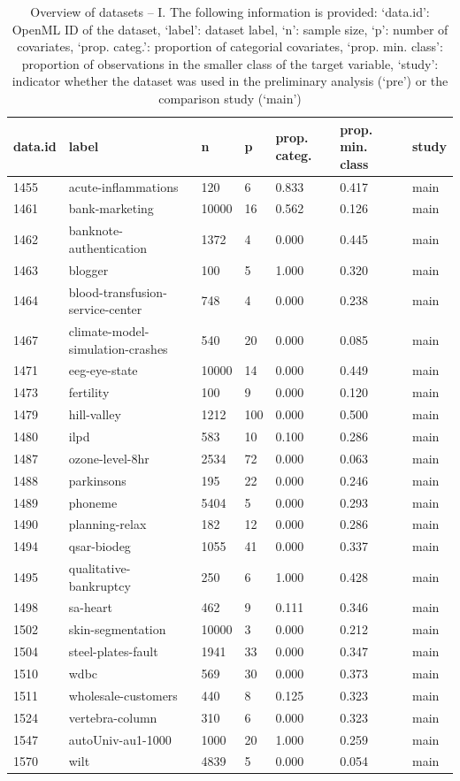 \begin{table}[!htb]
\caption{Overview of datasets -- I. The following information is provided: `data.id': OpenML ID of the dataset, `label': dataset label, `n': sample size, `p': number of covariates, `prop. categ.': proportion of categorial covariates, `prop. min. class': proportion of observations in the smaller class of the target variable, `study': indicator whether the dataset was used in the preliminary analysis (`pre') or the comparison study (`main')}
\label{tab:data1}
\begin{tabular}{l | l | l | l | l | l | l}
data.id & label & n & p & prop. categ. & prop. min. class & study \\
\hline
1455 & acute-inflammations & 120 & 6 & 0.833 & 0.417 & main \\
1461 & bank-marketing & 10000 & 16 & 0.562 & 0.126 & main \\
1462 & banknote-authentication & 1372 & 4 & 0.000 & 0.445 & main \\
1463 & blogger & 100 & 5 & 1.000 & 0.320 & main \\
1464 & blood-transfusion-service-center & 748 & 4 & 0.000 & 0.238 & main \\
1467 & climate-model-simulation-crashes & 540 & 20 & 0.000 & 0.085 & main \\
1471 & eeg-eye-state & 10000 & 14 & 0.000 & 0.449 & main \\
1473 & fertility & 100 & 9 & 0.000 & 0.120 & main \\
1479 & hill-valley & 1212 & 100 & 0.000 & 0.500 & main \\
1480 & ilpd & 583 & 10 & 0.100 & 0.286 & main \\
1487 & ozone-level-8hr & 2534 & 72 & 0.000 & 0.063 & main \\
1488 & parkinsons & 195 & 22 & 0.000 & 0.246 & main \\
1489 & phoneme & 5404 & 5 & 0.000 & 0.293 & main \\
1490 & planning-relax & 182 & 12 & 0.000 & 0.286 & main \\
1494 & qsar-biodeg & 1055 & 41 & 0.000 & 0.337 & main \\
1495 & qualitative-bankruptcy & 250 & 6 & 1.000 & 0.428 & main \\
1498 & sa-heart & 462 & 9 & 0.111 & 0.346 & main \\
1502 & skin-segmentation & 10000 & 3 & 0.000 & 0.212 & main \\
1504 & steel-plates-fault & 1941 & 33 & 0.000 & 0.347 & main \\
1510 & wdbc & 569 & 30 & 0.000 & 0.373 & main \\
1511 & wholesale-customers & 440 & 8 & 0.125 & 0.323 & main \\
1524 & vertebra-column & 310 & 6 & 0.000 & 0.323 & main \\
1547 & autoUniv-au1-1000 & 1000 & 20 & 1.000 & 0.259 & main \\
1570 & wilt & 4839 & 5 & 0.000 & 0.054 & main \\
\end{tabular}
\end{table}
